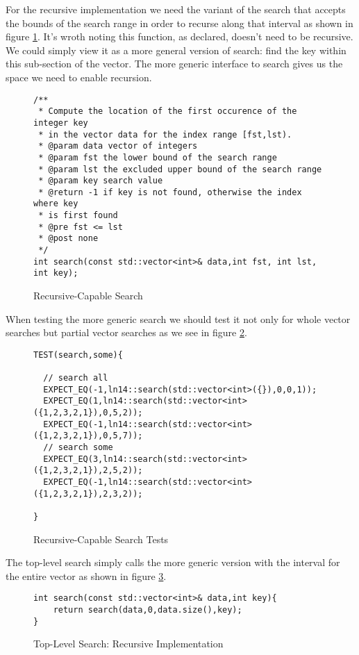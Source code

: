 \documentclass[]{tufte-handout}
\begin{document}
For the recursive implementation we need the variant of the search that accepts the bounds of the search range in order to recurse along that interval as shown in figure \ref{code:searchrecdecl}. It's wroth noting this function, as declared, doesn't need to be recursive. We could simply view it as a more general version of search: find the key within this sub-section of the vector. The more generic interface to search gives us the space we need to enable recursion. 

\begin{figure}[htpb!]
\begin{lstlisting}
/**
 * Compute the location of the first occurence of the integer key
 * in the vector data for the index range [fst,lst).
 * @param data vector of integers
 * @param fst the lower bound of the search range
 * @param lst the excluded upper bound of the search range
 * @param key search value
 * @return -1 if key is not found, otherwise the index where key
 * is first found
 * @pre fst <= lst
 * @post none
 */
int search(const std::vector<int>& data,int fst, int lst, int key);	
\end{lstlisting}
\label{code:searchrecdecl}
\caption{Recursive-Capable Search}
\end{figure}

When testing the more generic search we should test it not only for whole vector searches but partial vector searches as we see in figure \ref{code:searchrectests}.
\begin{figure}[htpb!]
\begin{lstlisting}
TEST(search,some){

  // search all
  EXPECT_EQ(-1,ln14::search(std::vector<int>({}),0,0,1));
  EXPECT_EQ(1,ln14::search(std::vector<int>({1,2,3,2,1}),0,5,2));
  EXPECT_EQ(-1,ln14::search(std::vector<int>({1,2,3,2,1}),0,5,7));
  // search some
  EXPECT_EQ(3,ln14::search(std::vector<int>({1,2,3,2,1}),2,5,2));
  EXPECT_EQ(-1,ln14::search(std::vector<int>({1,2,3,2,1}),2,3,2));

}
\end{lstlisting}
\label{code:searchrectests}
\caption{Recursive-Capable Search Tests}
\end{figure}

The top-level search simply calls the more generic version with the interval for the entire vector as shown in figure \ref{code:searchrectop}.
\begin{figure}[htpb!]
\begin{lstlisting}
int search(const std::vector<int>& data,int key){
	return search(data,0,data.size(),key);
}
\end{lstlisting}
\label{code:searchrectop}
\caption{Top-Level Search: Recursive Implementation}
\end{figure}
\end{document}
